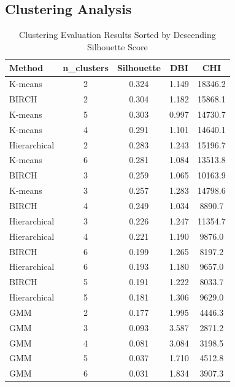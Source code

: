 \documentclass[conference]{IEEEtran}
\begin{document}
\subsection{Clustering Analysis}

\begin{table}[h]
    \renewcommand{\arraystretch}{1.2}
    \centering
    \caption{Clustering Evaluation Results Sorted by Descending Silhouette Score}
    \label{tab:clustering_results}
    \setlength{\tabcolsep}{3pt} %
    \scriptsize %
    \begin{tabular}{lcccc}
        \toprule
        \textbf{Method} & \textbf{n\_clusters} & \textbf{Silhouette} & \textbf{DBI} & \textbf{CHI} \\
        \midrule
        K-means        & 2  & 0.324 & 1.149 & 18346.2 \\
        BIRCH         & 2  & 0.304 & 1.182 & 15868.1 \\
        K-means        & 5  & 0.303 & 0.997 & 14730.7 \\
        K-means        & 4  & 0.291 & 1.101 & 14640.1 \\
        Hierarchical  & 2  & 0.283 & 1.243 & 15196.7 \\
        K-means        & 6  & 0.281 & 1.084 & 13513.8 \\
        BIRCH         & 3  & 0.259 & 1.065 & 10163.9 \\
        K-means        & 3  & 0.257 & 1.283 & 14798.6 \\
        BIRCH         & 4  & 0.249 & 1.034 & 8890.7 \\
        Hierarchical  & 3  & 0.226 & 1.247 & 11354.7 \\
        Hierarchical  & 4  & 0.221 & 1.190 & 9876.0 \\
        BIRCH         & 6  & 0.199 & 1.265 & 8197.2 \\
        Hierarchical  & 6  & 0.193 & 1.180 & 9657.0 \\
        BIRCH         & 5  & 0.191 & 1.222 & 8033.7 \\
        Hierarchical  & 5  & 0.181 & 1.306 & 9629.0 \\
        GMM           & 2  & 0.177 & 1.995 & 4446.3 \\
        GMM           & 3  & 0.093 & 3.587 & 2871.2 \\
        GMM           & 4  & 0.081 & 3.084 & 3198.5 \\
        GMM           & 5  & 0.037 & 1.710 & 4512.8 \\
        GMM           & 6  & 0.031 & 1.834 & 3907.3 \\
        \bottomrule
    \end{tabular}
\end{table}
\end{document}
